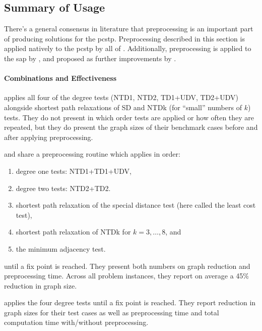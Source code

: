  \subsection{Summary of Usage}\label{sec:pre:summary-usage}
There's a general consensus in literature that preprocessing is an important part of producing solutions
for the \gls{pcstp}. Preprocessing described in this section is applied natively to the \gls{pcstp}
by all of
\citet{lucena2004strong, Ljubic:2004:memetic, ljubic2005solving,akhmedov2016divide,gamrath2017scip}.
Additionally, preprocessing is applied to the \gls{sap} by \citet{leitner2016dual}, and proposed
as further improvements by \citet{fu2014knowledge}.

\paragraph{Combinations and Effectiveness}

\citet{lucena2004strong} applies all four of the degree tests (NTD1, NTD2, TD1+UDV, TD2+UDV)
alongside shortest path relaxations of SD and NTDk (for ``small'' numbers of $k$)
tests. They do not
present in which order tests are applied or how often they are repeated, but they
do present the graph sizes of their benchmark cases before and after applying preprocessing.

\citet{Ljubic:2004:memetic} and \citet{ljubic2005solving} share a preprocessing routine
 which applies in order:
\begin{enumerate}
\item degree one tests: NTD1+TD1+UDV,
\item degree two tests: NTD2+TD2.
\item shortest path relaxation of the special distance test (here called the least cost test),
\item shortest path relaxation of NTDk for $k = 3,\ldots,8$, and
\item the minimum adjacency test.
\end{enumerate}
until a fix point is reached. They present both numbers on graph reduction and preprocessing
time. Across all problem instances, they report on average
a 45\% reduction in graph size.

\citet{akhmedov2016divide} applies the four degree tests until a fix point is reached. They
report reduction in graph sizes for their test cases as well as preprocessing time and
total computation time with/without preprocessing.

